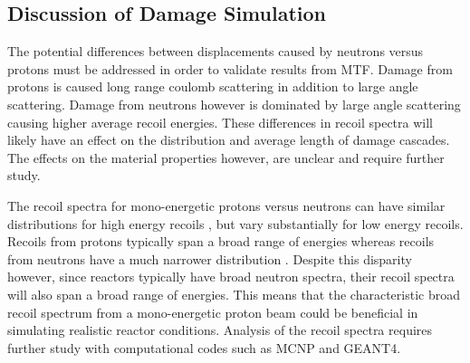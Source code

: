 \documentclass[final,3p,times,twocolumn]{elsarticle} %
\begin{document}
%
%

\subsection{Discussion of Damage Simulation}

The potential differences between displacements caused by neutrons versus protons must be addressed in order to validate results from MTF.  Damage from protons is caused long range coulomb scattering in addition to large angle scattering.  Damage from neutrons however is dominated by large angle scattering causing higher average recoil energies.  These differences in recoil spectra will likely have an effect on the distribution and average length of damage cascades.  The effects on the material properties however, are unclear and require further study.

The recoil spectra for mono-energetic protons versus neutrons can have similar distributions for high energy recoils \cite{Logan}, but vary substantially for low energy recoils.  Recoils from protons typically span a broad range of energies whereas recoils from neutrons have a much narrower distribution \cite{Was}.  Despite this disparity however, since reactors typically have broad neutron spectra, their recoil spectra will also span a broad range of energies.  This means that the characteristic broad recoil spectrum from a mono-energetic proton beam could be beneficial in simulating realistic reactor conditions.  Analysis of the recoil spectra requires further study with computational codes such as MCNP and GEANT4.
\end{document}

